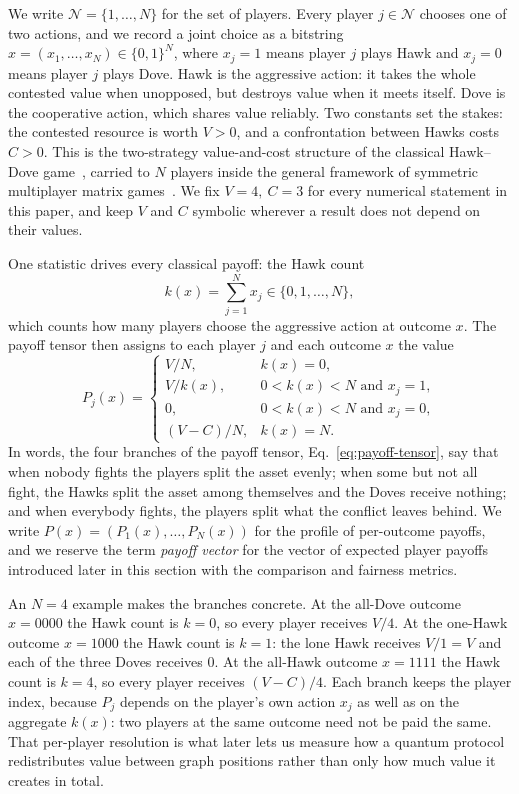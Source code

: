 \documentclass[conference,letterpaper,10pt]{IEEEtran}
\begin{document}
We write $\mathcal{N}=\{1,\ldots,N\}$ for the set of players. Every player
$j\in\mathcal{N}$ chooses one of two actions, and we record a joint choice as a
bitstring $x=(x_1,\ldots,x_N)\in\{0,1\}^N$, where $x_j=1$ means player $j$ plays
Hawk and $x_j=0$ means player $j$ plays Dove. Hawk is the aggressive action: it
takes the whole contested value when unopposed, but destroys value when it meets
itself. Dove is the cooperative action, which shares value reliably. Two
constants set the stakes: the contested resource is worth $V>0$, and
a confrontation between Hawks costs $C>0$. This is the two-strategy
value-and-cost structure of the classical Hawk--Dove
game~\cite{maynardsmith1973}, carried to $N$ players inside the general
framework of symmetric multiplayer matrix games~\cite{broom1997}. We fix
$V=4,\ C=3$ for every numerical statement in this paper, and keep $V$ and $C$ symbolic wherever
a result does not depend on their values.

One statistic drives every classical payoff: the Hawk count
\begin{equation}
k(x)=\sum_{j=1}^{N}x_{j}\in\{0,1,\ldots,N\},
\label{eq:hawk-count}
\end{equation}
which counts how many players choose the aggressive action at outcome $x$. The
payoff tensor then assigns to each player $j$ and each outcome $x$ the value
\begin{equation}
P_j(x)=
\begin{cases}
V/N, & k(x)=0,\\
V/k(x), & 0<k(x)<N \text{ and } x_j=1,\\
0, & 0<k(x)<N \text{ and } x_j=0,\\
(V-C)/N, & k(x)=N.
\end{cases}
\label{eq:payoff-tensor}
\end{equation}
In words, the four branches of the payoff tensor,
Eq.~\eqref{eq:payoff-tensor}, say that when nobody fights the players split the
asset evenly; when some but not all fight, the Hawks split the asset among
themselves and the Doves receive nothing; and when everybody fights, the players
split what the conflict leaves behind. We write
$P(x)=(P_1(x),\ldots,P_N(x))$ for the profile of per-outcome payoffs, and we
reserve the term \emph{payoff vector} for the vector of expected player payoffs
introduced later in this section with the comparison and fairness metrics.

An $N=4$ example makes the branches concrete. At the all-Dove outcome $x=0000$
the Hawk count is $k=0$, so every player receives $V/4$. At the one-Hawk outcome
$x=1000$ the Hawk count is $k=1$: the lone Hawk receives $V/1=V$ and each of the
three Doves receives $0$. At the all-Hawk outcome $x=1111$ the Hawk count is
$k=4$, so every player receives $(V-C)/4$. Each branch keeps the player index,
because $P_j$ depends on the player's own action $x_j$ as well as on the
aggregate $k(x)$: two players at the same outcome need not be paid the same.
That per-player resolution is what later lets us measure how a quantum protocol
redistributes value between graph positions rather than only how much value it
creates in total.
\end{document}
